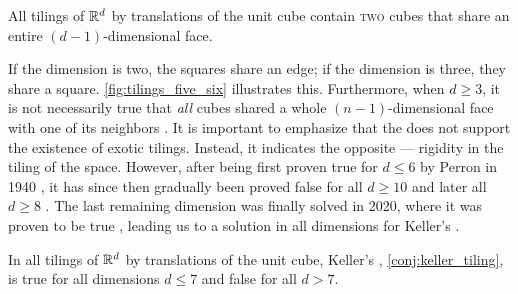 \documentclass[../thesis.tex]{subfiles}
\begin{document}
\begin{conjecture}\label{conj:keller_tiling}
    All tilings of $\mathbb{R}^d$ by translations of the unit cube contain \textsc{two} cubes that share an entire $(d-1)$-dimensional face.
\end{conjecture}  %



If the dimension is two, the squares share an edge; if the dimension is three, they share a square. \cref{fig:tilings_five_six} illustrates this. Furthermore, when $d\geq 3$, it is not necessarily true that \emph{all} cubes shared a whole $(n-1)$-dimensional face with one of its neighbors \cite{perronUeberLueckenloseAusfuellung1940}. It is important to emphasize that the  does not support the existence of exotic tilings. Instead, it indicates the opposite — rigidity in the tiling of the space. %
However, after being first proven true for $d\leq 6$ by Perron in 1940 \cite{perronModulartigeLueckenloseAusfuellung1940,perronModulartigeLueckenloseAusfuellung1940a}, it has since then gradually been proved false for all $d\geq10$ \cite{lagariasKellerCubetilingConjecture1992} and later all $d\geq8$ \cite{mackeyCubeTilingDimension2002}. The last remaining dimension was finally solved in 2020, where it was proven to be true \cite{brakensiekResolutionKellerConjecture2020}, leading us to a solution in all dimensions for Keller's .%

\begin{theorem}
    In all tilings of $\mathbb{R}^d$ by translations of the unit cube, Keller's , \cref{conj:keller_tiling}, is true for all dimensions $d\leq 7$ and false for all $d>7$.
\end{theorem}
\end{document}
